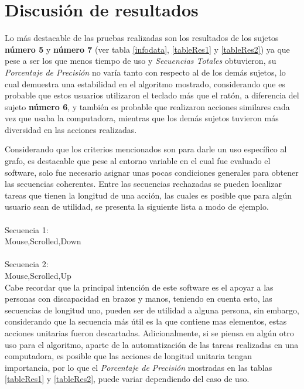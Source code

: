 \section{Discusi\'{o}n de resultados}


Lo m\'as destacable de las pruebas realizadas son los resultados de los sujetos 
 \textbf{n\'umero 5} y \textbf{n\'umero 7}
 (ver tabla \ref{infodata}, \ref{tableRes1} y 
 \ref{tableRes2}) ya que pese a ser los que menos tiempo de uso y
 \emph{Secuencias Totales} obtuvieron, su \emph{Porcentaje de Precisi\'on}
 no var\'ia tanto con respecto al de los dem\'as sujetos, lo cual demuestra 
 una estabilidad en el algoritmo mostrado, considerando que es probable que 
 estos usuarios utilizaron el teclado m\'as que el rat\'on, a diferencia del 
 sujeto \textbf{n\'umero 6}, y tambi\'en es probable que realizaron
 acciones similares cada vez que usaba la computadora, mientras que los 
 dem\'as sujetos tuvieron m\'as diversidad en las acciones realizadas.
 
 
Considerando que los criterios mencionados son para darle un uso espec\'ifico
 al grafo, es destacable que pese al entorno variable en el cual fue evaluado
 el software, solo fue necesario asignar unas pocas
 condiciones generales para obtener las secuencias coherentes. 
 Entre las secuencias rechazadas se pueden localizar tareas que tienen la
 longitud de una acci\'on, las cuales es posible que para alg\'un usuario 
 sean de utilidad, se presenta la siguiente lista a modo de ejemplo.
\\
\\
Secuencia 1:\\
Mouse,Scrolled,Down\\
\\
Secuencia 2:\\
Mouse,Scrolled,Up\\

Cabe recordar que la principal intenci\'on de este software es el apoyar a 
 las personas con discapacidad en brazos y manos, teniendo en cuenta esto, 
 las secuencias de longitud uno, pueden ser de utilidad a alguna persona, sin 
 embargo, considerando que la secuencia m\'as \'util es la que contiene mas 
 elementos, estas acciones unitarias fueron descartadas. Adicionalmente, si 
 se piensa en alg\'un otro uso para el algoritmo, aparte de la 
 automatizaci\'on de las tareas realizadas en una computadora, es posible que 
 las acciones de longitud unitaria tengan importancia, por lo que el
 \emph{Porcentaje de Precisi\'on} mostradas en las tablas \ref{tableRes1} y
 \ref{tableRes2}, puede variar dependiendo del caso de uso.

